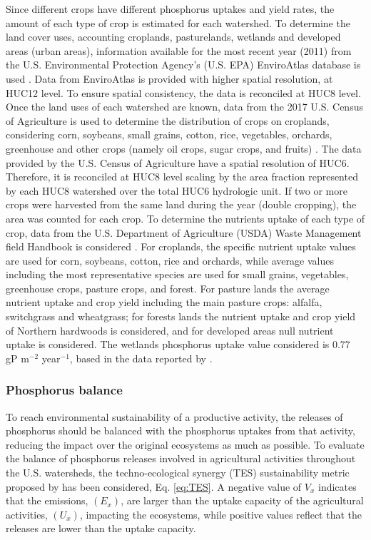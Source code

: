 \begin{refsection}[referencesCh3]
Since different crops have different phosphorus uptakes and yield rates, the amount of each type of crop is estimated for each watershed. To determine the land cover uses, accounting croplands, pasturelands, wetlands and developed areas (urban areas), information available for the most recent year (2011) from the U.S. Environmental Protection Agency's (U.S. EPA) EnviroAtlas database is used \citep{EnviroAtlas}. Data from EnviroAtlas is provided with higher spatial resolution, at HUC12 level. To ensure spatial consistency, the data is reconciled at HUC8 level. Once the land uses of each watershed are known, data from the 2017 U.S. Census of Agriculture is used to determine the distribution of crops on croplands, considering corn, soybeans, small grains, cotton, rice, vegetables, orchards, greenhouse and other crops (namely oil crops, sugar crops, and fruits) \citep{2017CensusofAgriculture}. The data provided by the U.S. Census of Agriculture have a spatial resolution of HUC6. Therefore, it is reconciled at HUC8 level scaling by the area fraction represented by each HUC8 watershed over the total HUC6 hydrologic unit. If two or more crops were harvested from the same land during the year (double cropping), the area was counted for each crop. To determine the nutrients uptake of each type of crop, data from the U.S. Department of Agriculture (USDA) Waste Management field Handbook is considered  \citep{USDAWaste}. For croplands, the specific nutrient uptake values are used for corn, soybeans, cotton, rice and orchards, while average values including the most representative species are used for small grains, vegetables, greenhouse crops, pasture crops, and forest. For pasture lands the average nutrient uptake and crop yield including the main pasture crops: alfalfa, switchgrass and wheatgrass; for forests lands the nutrient uptake and crop yield of Northern hardwoods is considered, and for developed areas null nutrient uptake is considered. The wetlands phosphorus uptake value considered is 0.77 gP m$^{-2}$ year$^{-1}$, based in the data reported by \citet{Kadlec}.

\subsubsection{Phosphorus balance}
To reach environmental sustainability of a productive activity, the releases of phosphorus should be balanced with the phosphorus uptakes from that activity, reducing the impact over the original ecosystems as much as possible. To evaluate the balance of phosphorus releases involved in agricultural activities throughout the U.S. watersheds, the techno-ecological synergy (TES) sustainability metric proposed by \citet{TESmetric} has been considered, Eq. \ref{eq:TES}. A negative value of $V_{x}$ indicates that the emissions, $\left(E_{x}\right)$, are larger than the uptake capacity of the agricultural activities, $\left(U_{x}\right)$, impacting the ecosystems, while positive values reflect that the releases are lower than the uptake capacity.


\end{refsection}
